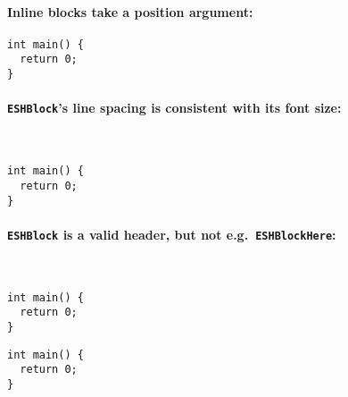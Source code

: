 \documentclass{article}
\begin{document}
\paragraph{Inline blocks take a position argument:}
\begin{verbatim}
int main() {
  return 0;
}
\end{verbatim}

\paragraph{\texttt{ESHBlock}'s line spacing is consistent with its font size:}~
\bgroup\def\ESHFontSize{\tiny}
\begin{verbatim}
int main() {
  return 0;
}
\end{verbatim}
\egroup

\paragraph{\texttt{ESHBlock} is a valid header, but not e.g.\ \texttt{ESHBlockHere}:}~
\begin{verbatim}
int main() {
  return 0;
}
\end{verbatim}
\begin{verbatim}
int main() {
  return 0;
}
\end{verbatim}
\end{document}
